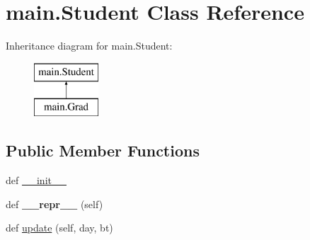 \hypertarget{classmain_1_1_student}{}\section{main.\+Student Class Reference}
\label{classmain_1_1_student}
Inheritance diagram for main.\+Student\+:\begin{figure}[H]
\begin{center}
\leavevmode
\includegraphics[height=2.000000cm]{classmain_1_1_student}
\end{center}
\end{figure}
\subsection*{Public Member Functions}
\begin{DoxyCompactItemize}
\item 
def \hyperlink{classmain_1_1_student_a495c5a676f26204f8e000e1194ed8110}{\+\_\+\+\_\+init\+\_\+\+\_\+}
\item 
\hypertarget{classmain_1_1_student_a5e0c2b9090e8b6f80e6c9d161ee84d97}{}def {\bfseries \+\_\+\+\_\+repr\+\_\+\+\_\+} (self)\label{classmain_1_1_student_a5e0c2b9090e8b6f80e6c9d161ee84d97}

\item 
def \hyperlink{classmain_1_1_student_a67de6c9f3d381d7234cef28bc0fadb21}{update} (self, day, bt)
\end{DoxyCompactItemize}

